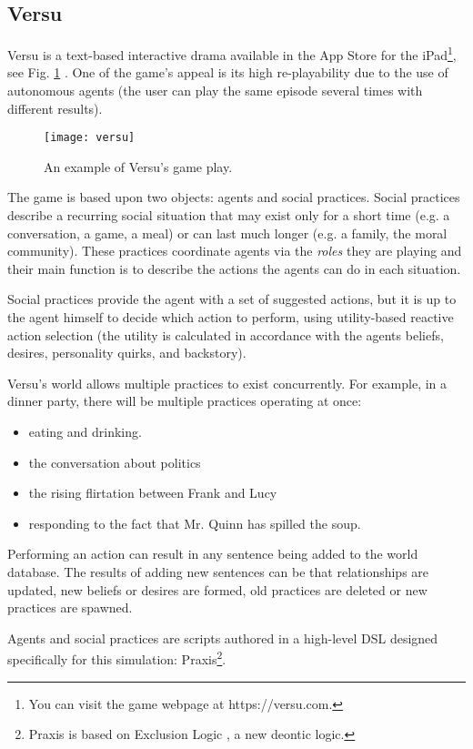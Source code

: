 \subsection{Versu}
Versu is a text-based interactive drama available in the App Store for the iPad\footnote{You can visit the game webpage at https://versu.com.}, see Fig. \ref{fig:versu}  \cite{evans:versu}.
One of the game's appeal is its high re-playability due to the use of autonomous agents (the user can play the same episode several times with different results).

\begin{figure}
  \centering
    \texttt{[image: versu]}
  \caption{An example of Versu's game play.}
  \label{fig:versu}
\end{figure}

The game is based upon two objects: agents and social practices.
Social practices describe a recurring social situation that may exist only for a short time (e.g. a conversation, a game, a meal) or can last much longer (e.g. a family, the moral community).
These practices coordinate agents via the \textit{roles} they are playing and their main function is to describe the actions the agents can do in each situation.

Social practices provide the agent with a set of suggested actions, but it is up to the agent himself to decide which action to perform, using utility-based reactive action selection (the utility is calculated in accordance with the agents beliefs, desires, personality quirks, and backstory).

Versu's world allows multiple practices to exist concurrently. For example, in a dinner party, there will be multiple practices operating at once:
\begin{itemize}
\item eating and drinking.
\item the conversation about politics
\item the rising flirtation between Frank and Lucy
\item responding to the fact that Mr. Quinn has spilled the soup.
\end{itemize}

Performing an action can result in any sentence being added to the world database.
The results of adding new sentences can be that relationships are updated, new beliefs or desires are formed, old practices are deleted or new practices are spawned.

Agents and social practices are scripts authored in a high-level \ac{DSL} designed specifically for this simulation: Praxis\footnote{Praxis is based on Exclusion Logic \cite{evans:exclusion-logic}, a new deontic logic.}.

